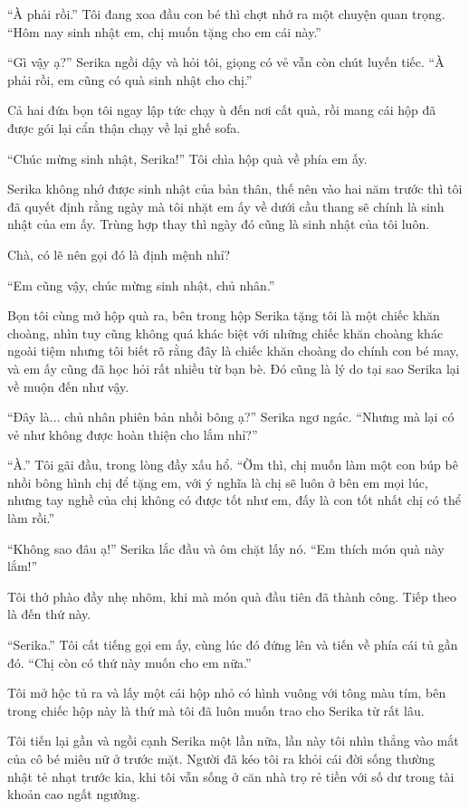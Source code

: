{``À phải rồi.'' Tôi đang xoa đầu con bé thì chợt nhớ ra một chuyện quan
trọng. ``Hôm nay sinh nhật em, chị muốn tặng cho em cái này.''

``Gì vậy ạ?'' Serika ngồi dậy và hỏi tôi, giọng có vẻ vẫn còn chút luyến
tiếc. ``À phải rồi, em cũng có quà sinh nhật cho chị.''

Cả hai đứa bọn tôi ngay lập tức chạy ù đến nơi cất quà, rồi mang cái hộp
đã được gói lại cẩn thận chạy về lại ghế sofa.

``Chúc mừng sinh nhật, Serika!'' Tôi chìa hộp quà về phía em ấy.

Serika không nhớ được sinh nhật của bản thân, thế nên vào hai năm trước
thì tôi đã quyết định rằng ngày mà tôi nhặt em ấy về dưới cầu thang sẽ
chính là sinh nhật của em ấy. Trùng hợp thay thì ngày đó cũng là sinh
nhật của tôi luôn.

Chà, có lẽ nên gọi đó là định mệnh nhỉ?

``Em cũng vậy, chúc mừng sinh nhật, chủ nhân.''

Bọn tôi cùng mở hộp quà ra, bên trong hộp Serika tặng tôi là một chiếc
khăn choàng, nhìn tuy cũng không quá khác biệt với những chiếc khăn
choàng khác ngoài tiệm nhưng tôi biết rõ rằng đây là chiếc khăn choàng
do chính con bé may, và em ấy cũng đã học hỏi rất nhiều từ bạn bè. Đó
cũng là lý do tại sao Serika lại về muộn đến như vậy.

``Đây là... chủ nhân phiên bản nhồi bông ạ?'' Serika ngơ ngác. ``Nhưng
mà lại có vẻ như không được hoàn thiện cho lắm nhỉ?''

``À.'' Tôi gãi đầu, trong lòng đầy xấu hổ. ``Ờm thì, chị muốn làm một
con búp bê nhồi bông hình chị để tặng em, với ý nghĩa là chị sẽ luôn ở
bên em mọi lúc, nhưng tay nghề của chị không có được tốt như em, đấy là
con tốt nhất chị có thể làm rồi.''

``Không sao đâu ạ!'' Serika lắc đầu và ôm chặt lấy nó. ``Em thích món
quà này lắm!''

Tôi thở phào đầy nhẹ nhõm, khi mà món quà đầu tiên đã thành công. Tiếp
theo là đến thứ này.

``Serika.'' Tôi cất tiếng gọi em ấy, cùng lúc đó đứng lên và tiến về
phía cái tủ gần đó. ``Chị còn có thứ này muốn cho em nữa.''

Tôi mở hộc tủ ra và lấy một cái hộp nhỏ có hình vuông với tông màu tím,
bên trong chiếc hộp này là thứ mà tôi đã luôn muốn trao cho Serika từ
rất lâu.

Tôi tiến lại gần và ngồi cạnh Serika một lần nữa, lần này tôi nhìn thẳng
vào mắt của cô bé miêu nữ ở trước mặt. Người đã kéo tôi ra khỏi cái đời
sống thường nhật tẻ nhạt trước kia, khi tôi vẫn sống ở căn nhà trọ rẻ
tiền với số dư trong tài khoản cao ngất ngưởng.

}
